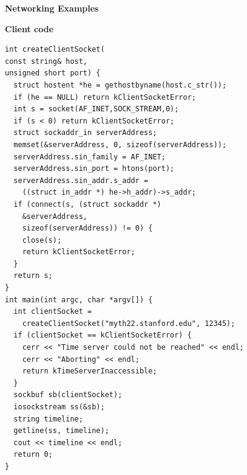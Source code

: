 \documentclass{article}
\begin{document}
\begin{multicols}{2}
  {\bf Networking Examples}

  {\bf Client code} {\scriptsize
  \begin{verbatim}
int createClientSocket(
const string& host,
unsigned short port) {
  struct hostent *he = gethostbyname(host.c_str());
  if (he == NULL) return kClientSocketError;
  int s = socket(AF_INET,SOCK_STREAM,0);
  if (s < 0) return kClientSocketError;
  struct sockaddr_in serverAddress;
  memset(&serverAddress, 0, sizeof(serverAddress));
  serverAddress.sin_family = AF_INET;
  serverAddress.sin_port = htons(port);
  serverAddress.sin_addr.s_addr =
    ((struct in_addr *) he->h_addr)->s_addr;
  if (connect(s, (struct sockaddr *)
    &serverAddress,
    sizeof(serverAddress)) != 0) {
    close(s);
    return kClientSocketError;
  }
  return s;
}
int main(int argc, char *argv[]) {
  int clientSocket =
    createClientSocket("myth22.stanford.edu", 12345);
  if (clientSocket == kClientSocketError) {
    cerr << "Time server could not be reached" << endl;
    cerr << "Aborting" << endl;
    return kTimeServerInaccessible;
  }
  sockbuf sb(clientSocket);
  iosockstream ss(&sb);
  string timeline;
  getline(ss, timeline);
  cout << timeline << endl;
  return 0;
} \end{verbatim} }


\end{multicols}
\end{document}
